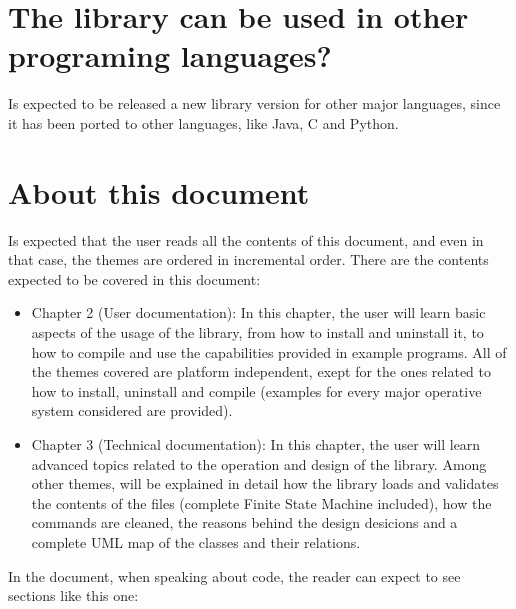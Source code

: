 \documentclass[11pt,twoside,openany,x11names,svgnames]{memoir}
\begin{document}
\section{The library can be used in other programing languages?}\label{The-library-can-be-used-in-other-programming-languages}

Is expected to be released a new library version for other major languages, since it has been ported to other languages, like Java, C and Python.

\section{About this document}\label{About-this-document}

Is expected that the user reads all the contents of this document, and even in that case, the themes are ordered in incremental order. There are the contents expected to be covered in this document:

\begin{itemize}
	\item Chapter 2 (User documentation): In this chapter, the user will learn basic aspects of the usage of the library, from how to install and uninstall it, to how to compile and use the capabilities provided in example programs. All of the themes covered are platform independent, exept for the ones related to how to install, uninstall and compile (examples for every major operative system considered are provided).
	\item Chapter 3 (Technical documentation): In this chapter, the user will learn advanced topics related to the operation and design of the library. Among other themes, will be explained in detail how the library loads and validates the contents of the files (complete Finite State Machine included), how the commands are cleaned, the reasons behind the design desicions and a complete UML map of the classes and their relations.
\end{itemize}

In the document, when speaking about code, the reader can expect to see sections like this one:


\end{document}

